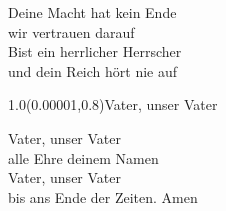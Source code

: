 \documentclass[aspectratio=169]{beamer}
\begin{document}
\begin{frame}
\centering
\color{white}
\huge{Deine Macht hat kein Ende} \\
\huge{wir vertrauen darauf} \\
\huge{Bist ein herrlicher Herrscher} \\
\huge{und dein Reich hört nie auf} \\

\begin{textblock}{1.0}(0.00001,0.8)\color{gray}\normalsize{Vater, unser Vater}\end{textblock}
\end{frame}

\begin{frame}
\centering
\color{white}
\huge{Vater, unser Vater} \\
\huge{alle Ehre deinem Namen} \\
\huge{Vater, unser Vater} \\
\huge{bis ans Ende der Zeiten. Amen} \\
\end{frame}
\end{document}
